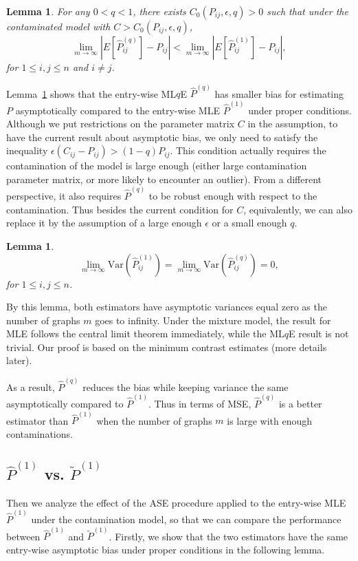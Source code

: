 \documentclass[a4paper]{article}
\newtheorem{lemma}[fact]{Lemma}
\renewcommand{\hat}{\widehat}
\begin{document}
\begin{lemma}
\label{lemma:ELqlEMLE}
For any $0 < q < 1$, there exists $C_0(P_{ij}, \epsilon, q) > 0$ such that under the contaminated model with $C > C_0(P_{ij}, \epsilon, q)$,
\[
	\lim_{m \to \infty} \left| E[\hat{P}^{(q)}_{ij}] - P_{ij} \right| < 
    \lim_{m \to \infty} \left| E[\hat{P}^{(1)}_{ij}] - P_{ij} \right|,
\]
for $1 \le i, j \le n$ and $i \ne j$.
\end{lemma}

Lemma~\ref{lemma:ELqlEMLE} shows that the entry-wise ML$q$E $\hat{P}^{(q)}$ has smaller bias for estimating $P$ asymptotically compared to the entry-wise MLE $\hat{P}^{(1)}$ under proper conditions. Although we put restrictions on the parameter matrix $C$ in the assumption, to have the current result about asymptotic bias, we only need to satisfy the inequality $\epsilon (C_{ij} - P_{ij}) > (1 - q) P_{ij}$. This condition actually requires the contamination of the model is large enough (either large contamination parameter matrix, or more likely to encounter an outlier). From a different perspective, it also requires $\hat{P}^{(q)}$ to be robust enough with respect to the contamination. Thus besides the current condition for $C$, equivalently, we can also replace it by the assumption of a large enough $\epsilon$ or a small enough $q$.

\begin{lemma}
\label{lemma:VarLqlVarMLE}
\[
	\lim_{m \to \infty} \mathrm{Var}(\hat{P}^{(1)}_{ij})
    = \lim_{m \to \infty} \mathrm{Var}(\hat{P}^{(q)}_{ij}) = 0,
\]
for $1 \le i, j \le n$.
\end{lemma}

By this lemma, both estimators have asymptotic variances equal zero as the number of graphs $m$ goes to infinity. Under the mixture model, the result for MLE follows the central limit theorem immediately, while the ML$q$E result is not trivial. Our proof is based on the minimum contrast estimates (more details later).

As a result, $\hat{P}^{(q)}$ reduces the bias while keeping variance the same asymptotically compared to $\hat{P}^{(1)}$. Thus in terms of MSE, $\hat{P}^{(q)}$ is a better estimator than $\hat{P}^{(1)}$ when the number of graphs $m$ is large with enough contaminations.

\subsection{$\hat{P}^{(1)}$ vs. $\widetilde{P}^{(1)}$}
Then we analyze the effect of the ASE procedure applied to the entry-wise MLE $\hat{P}^{(1)}$ under the contamination model, so that we can compare the performance between $\hat{P}^{(1)}$ and $\widetilde{P}^{(1)}$. Firstly, we show that the two estimators have the same entry-wise asymptotic bias under proper conditions in the following lemma.
\end{document}
